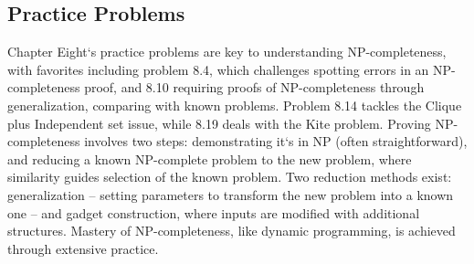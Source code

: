 \subsection*{Practice Problems}
Chapter Eight`s practice problems are key to understanding NP-completeness, with favorites including problem 8.4, which challenges spotting errors in an NP-completeness proof, and 8.10 requiring proofs of NP-completeness through generalization, comparing with known problems.
Problem 8.14 tackles the Clique plus Independent set issue, while 8.19 deals with the Kite problem.
Proving NP-completeness involves two steps: demonstrating it`s in NP (often straightforward), and reducing a known NP-complete problem to the new problem, where similarity guides selection of the known problem.
Two reduction methods exist: generalization -- setting parameters to transform the new problem into a known one -- and gadget construction, where inputs are modified with additional structures.
Mastery of NP-completeness, like dynamic programming, is achieved through extensive practice.

